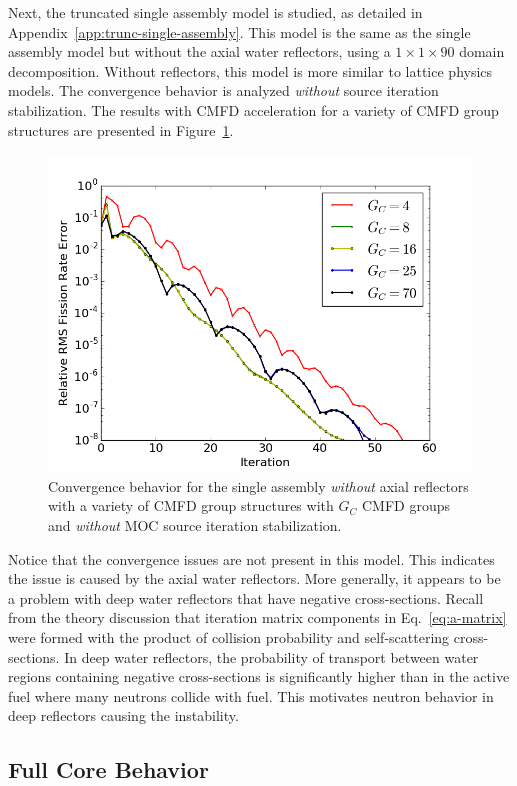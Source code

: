 Next, the truncated single assembly model is studied, as detailed in Appendix~\ref{app:trunc-single-assembly}. This model is the same as the single assembly model but without the axial water reflectors, using a $1\times 1\times 90$ domain decomposition. Without reflectors, this model is more similar to lattice physics models. The convergence behavior is analyzed \textit{without} source iteration stabilization. The results with \ac{CMFD} acceleration for a variety of \ac{CMFD} group structures are presented in Figure~\ref{fig:truncated-convergence}.
\begin{figure}[ht!]
	\centering
	\includegraphics[width=0.71\linewidth]{figures/convergence/sa_trunc_no_stab.png}
	\caption{Convergence behavior for the single assembly \textit{without} axial reflectors with a variety of \ac{CMFD} group structures with $G_C$ \ac{CMFD} groups and \textit{without} \ac{MOC} source iteration stabilization.}
	\label{fig:truncated-convergence}
\end{figure}
Notice that the convergence issues are not present in this model. This indicates the issue is caused by the axial water reflectors. More generally, it appears to be a problem with deep water reflectors that have negative cross-sections. Recall from the theory discussion that iteration matrix components in Eq.~\ref{eq:a-matrix} were formed with the product of collision probability and self-scattering cross-sections. In deep water reflectors, the probability of transport between water regions containing negative cross-sections is significantly higher than in the active fuel where many neutrons collide with fuel. This motivates neutron behavior in deep reflectors causing the instability. 

\subsection{Full Core Behavior}

